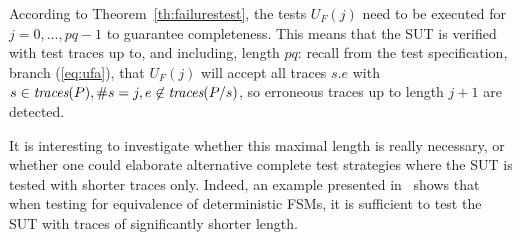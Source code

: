 According to Theorem~\ref{th:failurestest}, the tests $U_F(j)$ need to be
executed for $j = 0,\dots,pq-1$ to guarantee completeness. 
 This means that the SUT is verified with test
traces up to, and including, length $pq$: recall from the test specification,
branch (\ref{eq:ufa}), that $U_F(j)$ will accept all traces $s.e$ with
$s\in\text{\it traces}(P), \#s = j, e\not\in\text{\it traces}(P/s)$, so erroneous traces up to length
$j+1$ are detected.

It is interesting to investigate whether this maximal length is really
necessary, or whether one could elaborate alternative complete test
strategies where the SUT is tested with shorter traces only. Indeed, an
example  presented in~\cite[Exercise~5]{PeleskaHuangLectureNotesMBT} shows
that when testing for equivalence of deterministic FSMs, it is sufficient to
test the SUT with traces of significantly shorter length.

